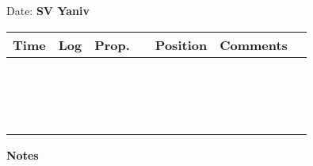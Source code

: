 \documentclass[11pt]{article}
\newcommand{\emptylogrow}{%
  \hspace*{2cm} & 
  \hspace*{1.5cm} & 
  \hspace*{2cm} & 
  \hspace*{1cm} & 
  \hspace*{1cm} & 
  \hspace{7.5cm} & 
  \hspace{5cm} \\ 
  \hline
}
\begin{document}
	
\pagestyle{empty}

Date: \hfill \textbf{SV Yaniv} 

\begin{longtable}{
	>{\centering\arraybackslash}p{2cm}
	|>{\centering\arraybackslash}p{1.5cm}
	|>{\centering\arraybackslash}p{2cm}
	|>{\centering\arraybackslash}p{1cm}
	|>{\centering\arraybackslash}p{1cm}
	|>{\centering\arraybackslash}p{8cm}
	|>{\centering\arraybackslash}p{7cm}
}
\hline
\textbf{Time} & 
\textbf{Log} & 
\textbf{Prop.} & 
\multicolumn{2}{c|}{\textbf{Velocity}} & 
\textbf{Position} & 
\textbf{Comments} \\
\hline


\emptylogrow
\emptylogrow
\emptylogrow
\emptylogrow
\emptylogrow
\emptylogrow
\emptylogrow
\emptylogrow
\emptylogrow
\emptylogrow
\emptylogrow
\emptylogrow
\emptylogrow
\emptylogrow
\emptylogrow
\emptylogrow


\end{longtable}

\textbf{Notes}
\end{document}
